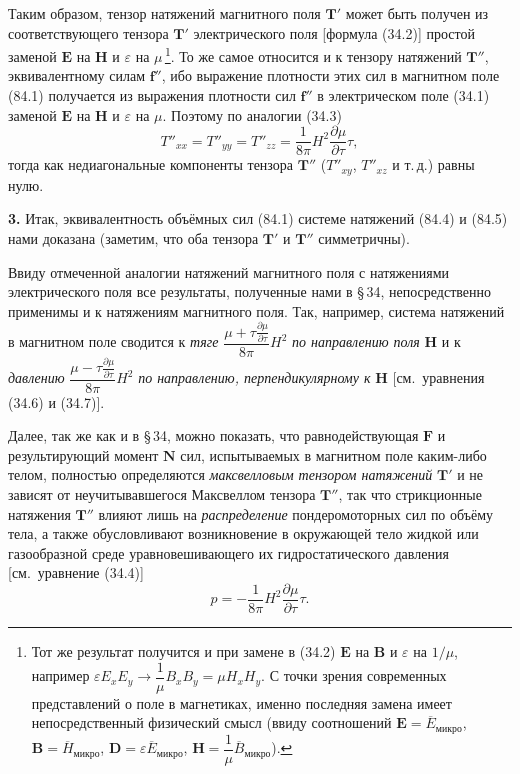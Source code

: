 \documentclass[a4paper,10pt]{article}
\begin{document}
Таким образом, тензор натяжений магнитного поля $\mathbf{T}'$ может быть
получен из соответствующего тензора $\mathbf{T}'$ электрического поля
[формула (34.2)] простой заменой $\mathbf{E}$ на $\mathbf{H}$ и
$\varepsilon$ на $\mu$\,\footnote{Тот же результат получится и при замене
в (34.2) $\mathbf{E}$ на $\mathbf{B}$ и $\varepsilon$ на $1/\mu$,
например $\varepsilon E_x E_y \to \dfrac{1}{\mu}B_x B_y = \mu H_x H_y$.
С точки зрения современных представлений о поле в магнетиках, именно
последняя замена имеет непосредственный физический смысл (ввиду
соотношений $\mathbf{E} = \overline{E}_{\text{микро}}$,
$\mathbf{B} = \overline{H}_{\text{микро}}$,
$\mathbf{D} = \varepsilon\overline{E}_{\text{микро}}$,
$\mathbf{H} = \dfrac{1}{\mu}\overline{B}_{\text{микро}}$).}. То же самое
относится и к тензору натяжений $\mathbf{T}''$, эквивалентному силам
$\mathbf{f}''$, ибо выражение плотности этих сил в магнитном поле (84.1)
получается из выражения плотности сил $\mathbf{f}''$ в электрическом поле
(34.1) заменой $\mathbf{E}$ на $\mathbf{H}$ и $\varepsilon$ на $\mu$.
Поэтому по аналогии (34.3)
\begin{equation}
    T''_{xx} = T''_{yy} = T''_{zz}
             = \frac{1}{8\pi}H^2\frac{\partial\mu}{\partial\tau}\tau,
    \tag{84.5}
\end{equation}
тогда как недиагональные компоненты тензора $\mathbf{T}''$ ($T''_{xy}$,
$T''_{xz}$ и т.\,д.) равны нулю.

\textbf{3.} Итак, эквивалентность объёмных сил (84.1) системе натяжений
(84.4) и (84.5) нами доказана (заметим, что оба тензора $\mathbf{T}'$ и
$\mathbf{T}''$ симметричны).

Ввиду отмеченной аналогии натяжений магнитного поля с натяжениями
электрического поля все результаты, полученные нами в §\,34, непосредственно
применимы и к натяжениям магнитного поля. Так, например, система натяжений
в магнитном поле сводится к \textit{тяге}
$\dfrac{\mu + \tau\frac{\partial\mu}{\partial\tau}}{8\pi}H^2$
\textit{по направлению поля} $\mathbf{H}$ и к \textit{давлению}
$\dfrac{\mu - \tau\frac{\partial\mu}{\partial\tau}}{8\pi}H^2$
\textit{по направлению, перпендикулярному к} $\mathbf{H}$
[см.\ уравнения (34.6) и (34.7)].

Далее, так же как и в §\,34, можно показать, что равнодействующая
$\mathbf{F}$ и результирующий момент $\mathbf{N}$ сил, испытываемых
в магнитном поле каким-либо телом, полностью определяются
\textit{максвелловым тензором натяжений} $\mathbf{T}'$ и не зависят от
неучитывавшегося Максвеллом тензора $\mathbf{T}''$, так что стрикционные
натяжения $\mathbf{T}''$ влияют лишь на \textit{распределение}
пондеромоторных сил по объёму тела, а также обусловливают возникновение
в окружающей тело жидкой или газообразной среде уравновешивающего их
гидростатического давления [см.\ уравнение (34.4)]
\begin{equation}
    p = -\frac{1}{8\pi}H^2\frac{\partial\mu}{\partial\tau}\tau.
    \tag{84.6}
\end{equation}
\end{document}
